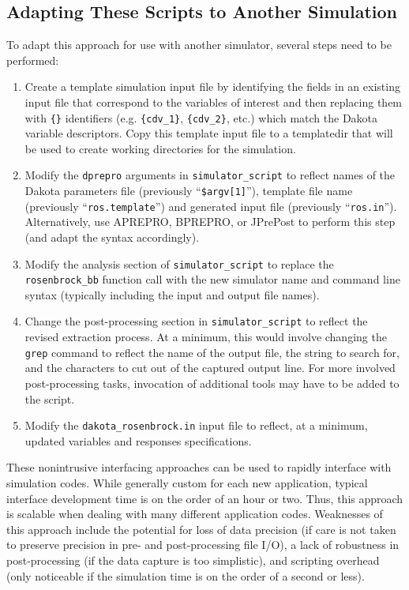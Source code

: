 \subsection{Adapting These Scripts to Another Simulation}

To adapt this approach for use with another simulator, several steps
need to be performed:

\begin{enumerate}
\item Create a template simulation input file by identifying the fields
  in an existing input file that correspond to the variables of
  interest and then replacing them with \texttt{\{\}} identifiers
  (e.g. \texttt{\{cdv\_1\}}, \texttt{\{cdv\_2\}}, etc.) which match
  the Dakota variable descriptors. Copy this template input file to a
  templatedir that will be used to create working directories for the
  simulation.

\item Modify the \texttt{dprepro} arguments in
  \texttt{simulator\_script} to reflect names of the Dakota parameters
  file (previously ``\texttt{\$argv[1]}''), template file name
  (previously ``\texttt{ros.template}'') and generated input file
  (previously ``\texttt{ros.in}''). Alternatively, use APREPRO,
  BPREPRO, or JPrePost to perform this step (and adapt the syntax
  accordingly).

\item Modify the analysis section of \texttt{simulator\_script} to
  replace the \texttt{rosenbrock\_bb} function call with the new
  simulator name and command line syntax (typically including the
  input and output file names).

\item Change the post-processing section in \texttt{simulator\_script}
  to reflect the revised extraction process. At a minimum, this would
  involve changing the \texttt{grep} command to reflect the name of
  the output file, the string to search for, and the characters to cut
  out of the captured output line. For more involved post-processing
  tasks, invocation of additional tools may have to be added to the
  script.

\item Modify the \texttt{dakota\_rosenbrock.in} input file to reflect,
  at a minimum, updated variables and responses specifications.
\end{enumerate}

These nonintrusive interfacing approaches can be used to rapidly
interface with simulation codes. While generally custom for each new
application, typical interface development time is on the order of an
hour or two. Thus, this approach is scalable when dealing with many
different application codes. Weaknesses of this approach include the
potential for loss of data precision (if care is not taken to preserve
precision in pre- and post-processing file I/O), a lack of robustness
in post-processing (if the data capture is too simplistic), and
scripting overhead (only noticeable if the simulation time is on the
order of a second or less).

